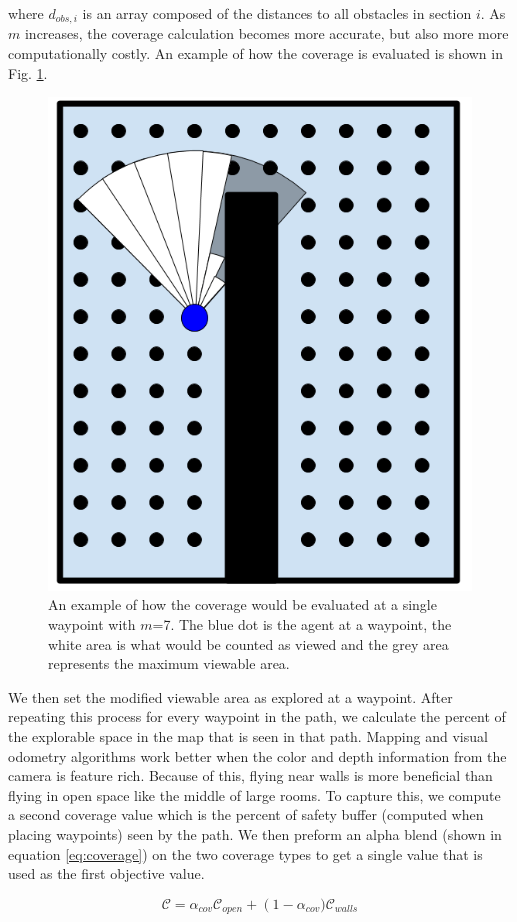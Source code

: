 \documentclass[letterpaper, 10 pt, conference]{ieeeconf}  %
\begin{document}
where $d_{obs,i}$ is an array composed of the distances to all obstacles in section $i$. As $m$ increases, the coverage calculation becomes more accurate, but also more more computationally costly. An example of how the coverage is evaluated is shown in Fig. \ref{fig:coverage_sections}.

\begin{figure}
\centering
\includegraphics[width=0.5\linewidth]{figures/coverage_sections.png}
\caption{An example of how the coverage would be evaluated at a single waypoint with $m$=7. The blue dot is the agent at a waypoint, the white area is what would be counted as viewed and the grey area represents the maximum viewable area.}
\label{fig:coverage_sections}
\end{figure}

We then set the modified viewable area as explored at a waypoint. After repeating this process for every waypoint in the path, we calculate the percent of the explorable space in the map that is seen in that path. Mapping and visual odometry algorithms work better when the color and depth information from the camera is feature rich. Because of this, flying near walls is more beneficial than flying in open space like the middle of large rooms. To capture this, we compute a second coverage value which is the percent of safety buffer (computed when placing waypoints) seen by the path. We then preform an alpha blend (shown in equation \ref{eq:coverage}) on the two coverage types to get a single value that is used as the first objective value.

\begin{equation}\label{eq:coverage}%
    \mathcal{C} = \alpha_{cov} \mathcal{C}_{open} + \left(1-\alpha_{cov})\right. \mathcal{C}_{walls}
\end{equation}
\end{document}
